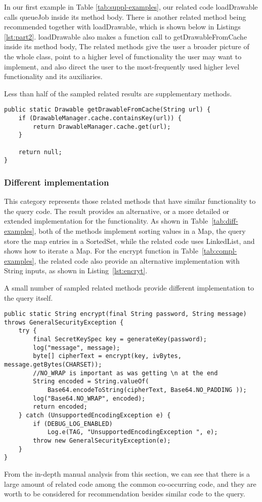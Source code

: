 In our first example in Table \ref{tab:suppl-examples}, our related code {\ttt loadDrawable} calls {\ttt queueJob} inside its method body. 
There is another related method being recommended together with {\ttt loadDrawable}, which is shown below in Listings \ref{lst:part2}. {\ttt loadDrawable} also makes a function call to {\ttt getDrawableFromCache} inside its method body, The related methods give the user a broader picture of the whole class, point to a higher level of functionality the user may want to implement, and also direct the user to the most-frequently used higher level functionality and its auxiliaries.

Less than half of the sampled related results are supplementary methods.

\lstset{
	frame=single,
}
\newpage
\begin{lstlisting}[style=MyJavaSmallStyle, caption={Related method \#2}, label={lst:part2}]
public static Drawable getDrawableFromCache(String url) {
	if (DrawableManager.cache.containsKey(url)) {
		return DrawableManager.cache.get(url);
	}
	
	return null;
}	
\end{lstlisting}


\subsubsection{Different implementation} This category represents those related methods that have similar functionality to the query code. The result provides an alternative, or a more detailed or extended implementation for the functionality. As shown in Table~\ref{tab:diff-examples}, both of the methods implement sorting values in a {\ttt Map}, the query store the map entries in a {\ttt SortedSet}, while the related code uses {\ttt LinkedList}, and shows how to iterate a {\ttt Map}. For the {\ttt encrypt} function in Table~\ref{tab:compl-examples}, the related code also provide an alternative implementation with {\ttt String} inputs, as shown in Listing~\ref{lst:encryt}.

A small number of sampled related methods provide different implementation to the query itself.
\vspace{2mm}
\begin{lstlisting}[style=MyJavaSmallStyle, caption={different implementation for \texttt{encrypt}}, label={lst:encryt}]
public static String encrypt(final String password, String message) throws GeneralSecurityException {
	try {
		final SecretKeySpec key = generateKey(password);
		log("message", message);
		byte[] cipherText = encrypt(key, ivBytes, message.getBytes(CHARSET));
		//NO_WRAP is important as was getting \n at the end
		String encoded = String.valueOf(
			Base64.encodeToString(cipherText, Base64.NO_PADDING ));
		log("Base64.NO_WRAP", encoded);
		return encoded;
	} catch (UnsupportedEncodingException e) {
		if (DEBUG_LOG_ENABLED)
			Log.e(TAG, "UnsupportedEncodingException ", e);
		throw new GeneralSecurityException(e);
	}
}
\end{lstlisting}


From the in-depth manual analysis from this section, we can see that there is a large amount of related code among the common co-occurring code, and they are worth to be considered for recommendation besides similar code to the query.


